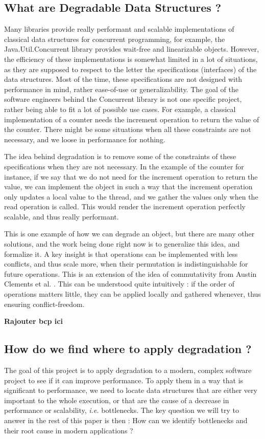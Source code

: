 \documentclass[conference]{IEEEtran}
\begin{document}
\subsection{What are Degradable Data Structures ?}
Many libraries provide really performant and scalable implementations of classical data structures for concurrent programming, for example, the Java.Util.Concurrent library \cite{java_concurrent} provides wait-free and linearizable objects. However, the efficiency of these implementations is somewhat limited in a lot of situations, as they are supposed to respect to the letter the specifications (interfaces) of the data structures. Most of the time, these specifications are not designed with performance in mind, rather ease-of-use or generalizability. The goal of the software engineers behind the Concurrent library is not one specific project, rather being able to fit a lot of possible use cases. For example, a classical implementation of a counter needs the increment operation to return the value of the counter. There might be some situations when all these constraints are not necessary, and we loose in performance for nothing.

The idea behind degradation is to remove some of the constraints of these specifications when they are not necessary. In the example of the counter for instance, if we say that we do not need for the increment operation to return the value, we can implement the object in such a way that the increment operation only updates a local value to the thread, and we gather the values only when the read operation is called. This would render the increment operation perfectly scalable, and thus really performant.

This is one example of how we can degrade an object, but there are many other solutions, and the work being done right now is to generalize this idea, and formalize it. A key insight is that operations can be implemented with less conflicts, and thus scale more, when their permutation is indistinguishable for future operations. This is an extension of the idea of commutativity from Austin Clements et al. \cite{scalable}. This can be understood quite intuitively : if the order of operations matters little, they can be applied locally and gathered whenever, thus ensuring conflict-freedom.

\textbf{Rajouter bcp ici}


\subsection{How do we find where to apply degradation ?}
The goal of this project is to apply degradation to a modern, complex software project to see if it can improve performance. To apply them in a way that is significant to performance, we need to locate data structures that are either very important to the whole execution, or that are the cause of a decrease in performance or scalability, \textit{i.e.} bottlenecks. The key question we will try to answer in the rest of this paper is then : How can we identify bottlenecks and their root cause in modern applications ?
\end{document}
